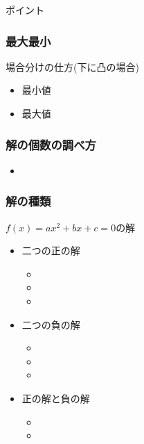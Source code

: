 \documentclass[10pt,dvipdfmx]{jsarticle}
\begin{document}
\begin{itembox}[l]{ポイント}
  \vspace{8mm}
\end{itembox}



\subsubsection*{最大最小}
\begin{itembox}[l]{場合分けの仕方(下に凸の場合)}
  \begin{itemize}
    \item 最小値\vspace{5cm}
    \item 最大値\vspace{5cm}
  \end{itemize}

\end{itembox}

\subsubsection*{解の個数の調べ方}
\begin{large}
  \begin{itemize}
    \item
  \end{itemize}
\end{large}

\subsubsection*{解の種類}
$f(x)=ax^2+bx+c=0$の解
\begin{multicols}{3}
  \begin{large}
    \begin{itemize}
      \item 二つの正の解
            \begin{itemize}
              \item \item \item
            \end{itemize}
      \item 二つの負の解
            \begin{itemize}
              \item \item \item
            \end{itemize}
      \item 正の解と負の解
            \begin{itemize}
              \item \item
            \end{itemize}
    \end{itemize}
  \end{large}
\end{multicols}
\end{document}
